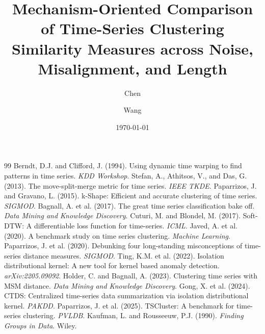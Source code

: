 \documentclass[11pt,a4paper]{article}
\title{Mechanism-Oriented Comparison of Time-Series Clustering\\
Similarity Measures across Noise, Misalignment, and Length}
\author{Chen \and Wang}
\date{\today}
\begin{document}
\maketitle





\begin{thebibliography}{99}
 Berndt, D.J. and Clifford, J. (1994). Using dynamic time warping to find patterns in time series. \emph{KDD Workshop}.
 Stefan, A., Athitsos, V., and Das, G. (2013). The move-split-merge metric for time series. \emph{IEEE TKDE}.
 Paparrizos, J. and Gravano, L. (2015). k-Shape: Efficient and accurate clustering of time series. \emph{SIGMOD}.
 Bagnall, A. et al. (2017). The great time series classification bake off. \emph{Data Mining and Knowledge Discovery}.
 Cuturi, M. and Blondel, M. (2017). Soft-DTW: A differentiable loss function for time-series. \emph{ICML}.
 Javed, A. et al. (2020). A benchmark study on time series clustering. \emph{Machine Learning}.
 Paparrizos, J. et al. (2020). Debunking four long-standing misconceptions of time-series distance measures. \emph{SIGMOD}.
 Ting, K.M. et al. (2022). Isolation distributional kernel: A new tool for kernel based anomaly detection. \emph{arXiv:2205.09092}.
 Holder, C. and Bagnall, A. (2023). Clustering time series with MSM distance. \emph{Data Mining and Knowledge Discovery}.
 Gong, X. et al. (2024). CTDS: Centralized time-series data summarization via isolation distributional kernel. \emph{PAKDD}.
 Paparrizos, J. et al. (2025). TSCluster: A benchmark for time-series clustering. \emph{PVLDB}.
 Kaufman, L. and Rousseeuw, P.J. (1990). \emph{Finding Groups in Data}. Wiley.
\end{thebibliography}
\end{document}
